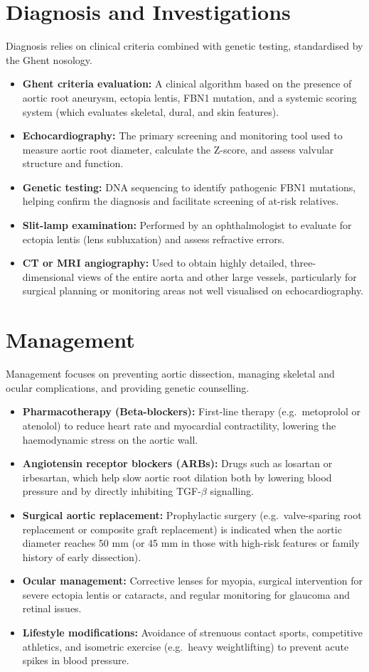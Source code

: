 \section*{Diagnosis and Investigations}
Diagnosis relies on clinical criteria combined with genetic testing, standardised by the Ghent nosology.
\begin{itemize}
    \item \textbf{Ghent criteria evaluation:} A clinical algorithm based on the presence of aortic root aneurysm, ectopia lentis, FBN1 mutation, and a systemic scoring system (which evaluates skeletal, dural, and skin features).
    \item \textbf{Echocardiography:} The primary screening and monitoring tool used to measure aortic root diameter, calculate the Z-score, and assess valvular structure and function.
    \item \textbf{Genetic testing:} DNA sequencing to identify pathogenic FBN1 mutations, helping confirm the diagnosis and facilitate screening of at-risk relatives.
    \item \textbf{Slit-lamp examination:} Performed by an ophthalmologist to evaluate for ectopia lentis (lens subluxation) and assess refractive errors.
    \item \textbf{CT or MRI angiography:} Used to obtain highly detailed, three-dimensional views of the entire aorta and other large vessels, particularly for surgical planning or monitoring areas not well visualised on echocardiography.
\end{itemize}

\section*{Management}
Management focuses on preventing aortic dissection, managing skeletal and ocular complications, and providing genetic counselling.
\begin{itemize}
    \item \textbf{Pharmacotherapy (Beta-blockers):} First-line therapy (e.g.\ metoprolol or atenolol) to reduce heart rate and myocardial contractility, lowering the haemodynamic stress on the aortic wall.
    \item \textbf{Angiotensin receptor blockers (ARBs):} Drugs such as losartan or irbesartan, which help slow aortic root dilation both by lowering blood pressure and by directly inhibiting TGF-$\beta$ signalling.
    \item \textbf{Surgical aortic replacement:} Prophylactic surgery (e.g.\ valve-sparing root replacement or composite graft replacement) is indicated when the aortic diameter reaches 50 mm (or 45 mm in those with high-risk features or family history of early dissection).
    \item \textbf{Ocular management:} Corrective lenses for myopia, surgical intervention for severe ectopia lentis or cataracts, and regular monitoring for glaucoma and retinal issues.
    \item \textbf{Lifestyle modifications:} Avoidance of strenuous contact sports, competitive athletics, and isometric exercise (e.g.\ heavy weightlifting) to prevent acute spikes in blood pressure.
\end{itemize}


